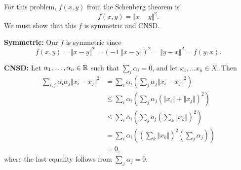 \documentclass[twoside,10pt]{article}
\begin{document}
For this problem, $f(x,y)$ from the Schenberg theorem is
\[
	f(x,y) = {\Vert{x-y}\Vert}^{2}.
\] We must show that this $f$ is symmetric and CNSD.

\textbf{Symmetric:} Our $f$ is symmetric since
\[
	f(x,y) = {\Vert{x-y}\Vert}^{2} = \left( -1 \; {\Vert{x-y}\Vert} \right)^{2} = {\Vert{y-x}\Vert}^2 = f(y,x).
\] 

\textbf{CNSD:} Let $\alpha_{1}, \dots, \alpha_{n} \in \mathbb{R}$ such that $\sum_i \alpha_i = 0$, and let $x_1, \dots x_{n} \in X$. Then
\begin{align*}
	\sum_{i,j}\alpha_{i}\alpha_{j} {\Vert{x_i - x_j}\Vert}^{2} &= \sum_{i} \alpha_{i}\left( \sum_{j} \alpha_{j} {\Vert{x_i-x_j}\Vert}^{2} \right) \\
								   &\leq \sum_{i}\alpha_{i} \left( \sum_{j}\alpha_{j} \left( {\Vert{x_i}\Vert}+{\Vert{x_j}\Vert} \right)^{2} \right) \\
								   &\leq \sum_{i}\alpha_{i} \left( \sum_{j}a_{j} \left( \sum_{k}{\Vert{x_{k}}\Vert} \right)^{2} \right) \\
								   &= \sum_{i}\alpha_{i} \left( \left( \sum_{k}{\Vert{x_{k}}\Vert} \right)^{2} \left( \sum_{j}\alpha_{j} \right) \right) \\
								   &= 0,
\end{align*}
where the last equality follows from $\sum_{j}\alpha_{j}=0$.
\end{document}
